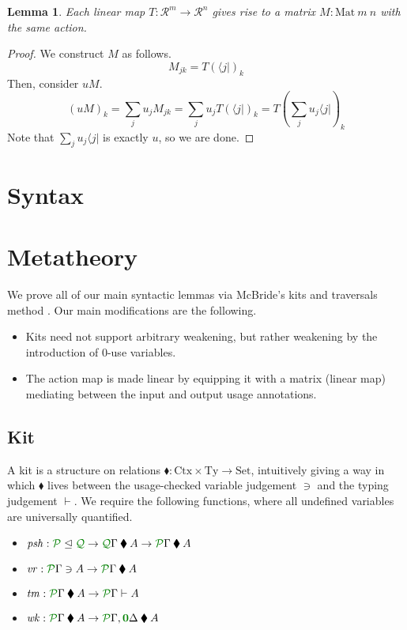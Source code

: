 \documentclass[submission,copyright,creativecommons]{eptcs}
\newtheorem{lemma}[theorem]{Lemma}
\newcommand{\kitrel}{\mathbin{\blacklozenge}}
\begin{document}
\begin{lemma}
  Each linear map $T : \mathscr R^m \to \mathscr R^n$ gives rise to a matrix
  $M : \mathrm{Mat}~m~n$ with the same action.
\end{lemma}
\begin{proof}
  We construct $M$ as follows.
  \[
    M_{jk} = T(\langle j \rvert)_k
  \]
  Then, consider $uM$.
  \[
    (uM)_k = \sum_j u_jM_{jk} = \sum_j u_jT\left(\langle j \rvert\right)_k
    = T\left(\sum_j u_j\langle j \rvert\right)_k
  \]
  Note that $\sum_j u_j\langle j \rvert$ is exactly $u$, so we are done.
\end{proof}

\section{Syntax}

\section{Metatheory}

We prove all of our main syntactic lemmas via McBride's kits and traversals
method \cite{mcbride2005type}.
Our main modifications are the following.
\begin{itemize}
  \item Kits need not support arbitrary weakening, but rather weakening by the
    introduction of $0$-use variables.
  \item The action map is made linear by equipping it with a matrix (linear map)
    mediating between the input and output usage annotations.
\end{itemize}

\subsection{Kit}

A kit is a structure on relations
$\kitrel : \mathrm{Ctx} \times \mathrm{Ty} \to \mathrm{Set}$, intuitively
giving a way in which $\kitrel$ lives between the usage-checked variable
judgement $\ni$ and the typing judgement $\vdash$.
We require the following functions, where all undefined variables are
universally quantified.

\begin{itemize}
  \item
    $\mathit{psh} : \resctx P \subres \resctx Q \to
    \ctx{\Gamma}{Q} \kitrel A \to \ctx{\Gamma}{P} \kitrel A$
  \item $\mathit{vr} : \ctx{\Gamma}{P} \ni A \to
    \ctx{\Gamma}{P} \kitrel A$
  \item $\mathit{tm} : \ctx{\Gamma}{P} \kitrel A \to
    \ctx{\Gamma}{P} \vdash A$
  \item $\mathit{wk} : \ctx{\Gamma}{P} \kitrel A \to
    \ctx{\Gamma}{P}, \ctx{\Delta}{\vct 0} \kitrel A$
\end{itemize}
\end{document}
